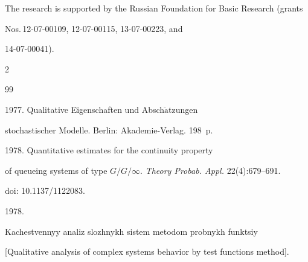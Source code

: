 







\Ack

\noindent

The research is supported by the Russian Foundation for Basic Research (grants 

Nos.\,12-07-00109, 12-07-00115, 13-07-00223, and

14-07-00041).



\begin{multicols}{2}



\renewcommand{\bibname}{\protect\rmfamily References}




{\small\frenchspacing

{%


\begin{thebibliography}{99}






 1977. Qualitative Eigenschaften und Absch$\ddot{\mbox{a}}$tzungen

stochastischer Modelle. Berlin: Akademie-Verlag. 198~p.


 1978. Quantitative estimates for the continuity property

of queueing systems of type $G/G/\infty$. \textit{Theory Probab. Appl.} 22(4):679--691.

doi: 10.1137/1122083.


 1978.

Kachestvennyy analiz slozhnykh sistem metodom probnykh funktsiy

[Qualitative analysis of complex systems behavior by test functions method].


\end{thebibliography}}}
\end{multicols}
